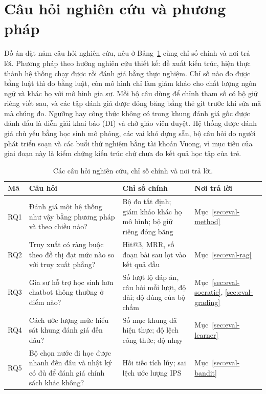 \section{Câu hỏi nghiên cứu và phương pháp}
Đồ án đặt năm câu hỏi nghiên cứu, nêu ở Bảng~\ref{tab:rq} cùng chỉ số chính và nơi trả lời. Phương pháp theo hướng nghiên cứu thiết kế: đề xuất kiến trúc, hiện thực thành hệ thống chạy được rồi đánh giá bằng thực nghiệm. Chỉ số nào đo được bằng luật thì đo bằng luật, còn mô hình chỉ làm giám khảo cho chất lượng ngôn ngữ và khác họ với mô hình gia sư. Mỗi bộ câu dùng để chỉnh tham số có bộ giữ riêng viết sau, và các tập đánh giá được đóng băng bằng thẻ git trước khi sửa mã mà chúng đo. Ngưỡng hay công thức không có trong khung đánh giá gốc được đánh dấu là diễn giải khai báo (DI) và chờ giáo viên duyệt. Hệ thống được đánh giá chủ yếu bằng học sinh mô phỏng, các vai khó dựng sẵn, bộ câu hỏi do người phát triển soạn và các buổi thử nghiệm bằng tài khoản Vuong, vì mục tiêu của giai đoạn này là kiểm chứng kiến trúc chứ chưa đo kết quả học tập của trẻ.

\begin{table}[H]
\centering
\caption{Các câu hỏi nghiên cứu, chỉ số chính và nơi trả lời.}
\label{tab:rq}
\small
\begin{tabularx}{\linewidth}{@{}p{1.1cm}>{\raggedright\arraybackslash}p{5.3cm}XX@{}}
\toprule
Mã & Câu hỏi & Chỉ số chính & Nơi trả lời \\
\midrule
RQ1 & Đánh giá một hệ thống như vậy bằng phương pháp và theo chiều nào? & Bộ đo tất định; giám khảo khác họ mô hình; bộ giữ riêng đóng băng & Mục~\ref{sec:eval-method} \\
RQ2 & Truy xuất có ràng buộc theo đồ thị đạt mức nào so với truy xuất phẳng? & Hit@3, MRR, số đoạn bài sau lọt vào kết quả đầu & Mục~\ref{sec:eval-rag} \\
RQ3 & Gia sư hỗ trợ học sinh hơn chatbot thông thường ở điểm nào? & Số lượt lộ đáp án, câu hỏi mỗi lượt, độ dài; độ đúng của bộ chấm & Mục~\ref{sec:eval-socratic}, \ref{sec:eval-grading} \\
RQ4 & Cách ước lượng mức hiểu sát khung đánh giá đến đâu? & Số mục khung đã hiện thực; độ lệch công thức; độ nhạy & Mục~\ref{sec:eval-learner} \\
RQ5 & Bộ chọn nước đi học được nhanh đến đâu và nhật ký có đủ để đánh giá chính sách khác không? & Hối tiếc tích lũy; sai lệch ước lượng IPS & Mục~\ref{sec:eval-bandit} \\
\bottomrule
\end{tabularx}
\end{table}

